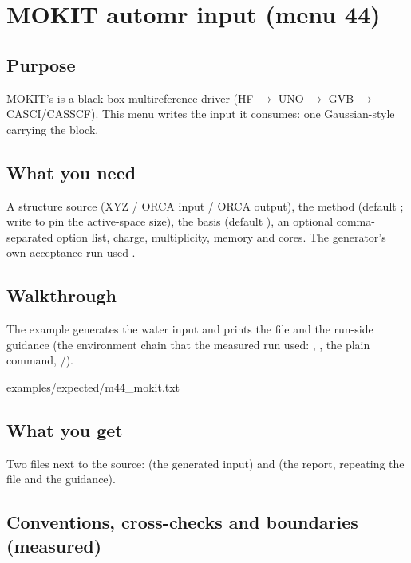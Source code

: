 \chapter{MOKIT automr input (menu 44)}
\label{ch:menu44}

\section{Purpose}

MOKIT's  is a black-box multireference driver (HF $\to$ UNO
$\to$ GVB $\to$ CASCI/CASSCF).  This menu writes the input it consumes:
one Gaussian-style  carrying the  block.

\section{What you need}

A structure source (XYZ / ORCA input / ORCA output), the method (default
; write  to pin the active-space size),
the basis (default ), an optional comma-separated
 option list, charge, multiplicity, memory and cores.
The generator's own acceptance run used .

\section{Walkthrough}

The example generates the water input and prints the file and the
run-side guidance (the environment chain that the measured run used:
, , the plain  command,
/).


  {examples/expected/m44_mokit.txt}

\section{What you get}

Two files next to the source:  (the generated
input) and  (the report, repeating the file
and the guidance).

\section{Conventions, cross-checks and boundaries (measured)}

